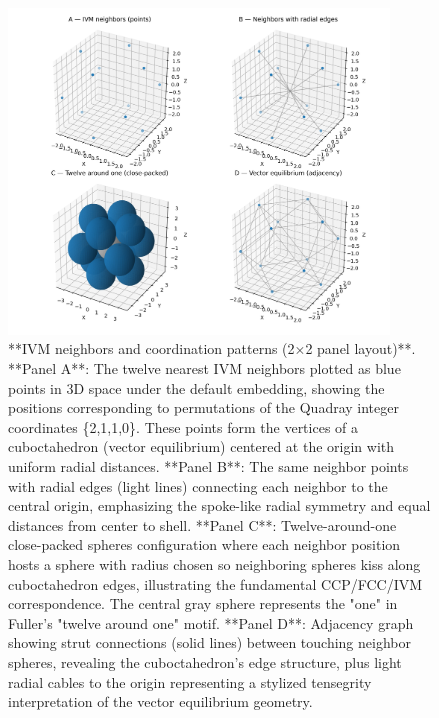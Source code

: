 \documentclass[
  10pt,
]{article}
\begin{document}
\begin{figure}[htbp]
\centering
\includegraphics[width=0.9\textwidth]{figures/ivm_neighbors_edges.png}
\caption{**IVM neighbors and coordination patterns (2×2 panel layout)**. **Panel A**: The twelve nearest IVM neighbors plotted as blue points in 3D space under the default embedding, showing the positions corresponding to permutations of the Quadray integer coordinates \{2,1,1,0\}. These points form the vertices of a cuboctahedron (vector equilibrium) centered at the origin with uniform radial distances. **Panel B**: The same neighbor points with radial edges (light lines) connecting each neighbor to the central origin, emphasizing the spoke-like radial symmetry and equal distances from center to shell. **Panel C**: Twelve-around-one close-packed spheres configuration where each neighbor position hosts a sphere with radius chosen so neighboring spheres kiss along cuboctahedron edges, illustrating the fundamental CCP/FCC/IVM correspondence. The central gray sphere represents the "one" in Fuller's "twelve around one" motif. **Panel D**: Adjacency graph showing strut connections (solid lines) between touching neighbor spheres, revealing the cuboctahedron's edge structure, plus light radial cables to the origin representing a stylized tensegrity interpretation of the vector equilibrium geometry.}
\label{fig:ivm_neighbors_edges}
\end{figure}
\end{document}
